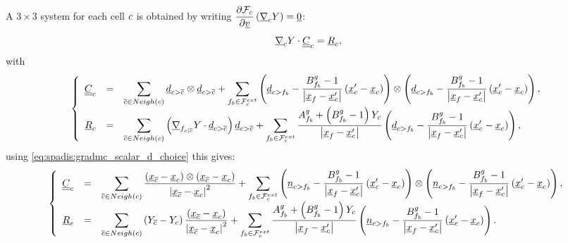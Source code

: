 A $3\times 3$ system for each cell $c$
is obtained by writing  $\dfrac{\partial \mathcal{F}_c}{\partial \underline{v} }
\left( \underline{\nabla}_{c} Y \right)= \underline{0}$:
%
\begin{equation}\label{eq:spadis:gradmc_matrix}
\underline{\nabla}_{c} Y \cdot \underline{\underline{C}}_{c} = \underline{R}_{c} ,
\end{equation}
with
%
\begin{equation}
\left\{
\begin{array}{r c l}
\underline{\underline{C}}_{c} &=&
\displaystyle
 \sum\limits_{{\overline{c}} \in Neigh\left(c\right) }
 \underline{d}_{{c > {\overline{c}}}} \otimes \underline{d}_{{c > {\overline{c}}}}
+
\sum\limits_{{{f}_{b}} \in \mathcal{F}^{ext}_{c}}
\left( \underline{d}_{c>{{f}_{b}}} -\dfrac{ B^g_{{f}_{b}} -1}{\left| \underline{x}_{{f}} - \underline{x}_{c}^\prime \right|}  \left(\underline{x}_{c}^\prime - {\underline{x}_{c}}\right) \right)
\otimes
\left( \underline{d}_{c>{{f}_{b}}} -\dfrac{ B^g_{{f}_{b}} -1}{\left| \underline{x}_{{f}} - \underline{x}_{c}^\prime \right|}  \left(\underline{x}_{c}^\prime - {\underline{x}_{c}}\right) \right),
\\
\underline{R}_{c} &=&
\displaystyle
\sum\limits_{ {\overline{c}} \in Neigh\left(c\right) }
\left( \underline{\nabla}_{{{f}_{c|{\overline{c}}}}} Y   \cdot \underline{d}_{{c > {\overline{c}}}} \right) \underline{d}_{{c > {\overline{c}}}}
+
\sum\limits_{ {{f}_{b}} \in \mathcal{F}^{ext}_{c}}
\dfrac{
A^g_{{{f}_{b}}} +\left(B^g_{{{f}_{b}}} -1 \right) Y_{c}
}{
\left| \underline{x}_{{f}} - \underline{x}_{c}^\prime \right|
}
\left( \underline{d}_{c>{{f}_{b}}} -  \dfrac{B^g_{{{f}_{b}}} -1 }{\left| \underline{x}_{{f}} - \underline{x}_{c}^\prime \right|} \left(\underline{x}_{c}^\prime - {\underline{x}_{c}}\right) \right),
\end{array}\right.
\end{equation}
%
using \eqref{eq:spadis:gradmc_scalar_d_choice} this gives:
\begin{equation}
\left\lbrace
\begin{array}{r c l}
\underline{\underline{C}}_{c} &=&
\displaystyle
 \sum\limits_{{\overline{c}} \in Neigh\left(c\right) }
 \dfrac{\left(\underline{x}_{{\overline{c}}} - {\underline{x}_{c}}\right) \otimes \left(\underline{x}_{{\overline{c}}} - {\underline{x}_{c}}\right)}{\left| \underline{x}_{{\overline{c}}} - {\underline{x}_{c}} \right|^2}
 +
\sum\limits_{{{f}_{b}} \in \mathcal{F}^{ext}_{c}}
\left( \underline{n}_{c>{{f}_{b}}} -\dfrac{ B^g_{{{f}_{b}}} -1}{\left| \underline{x}_{{f}} - \underline{x}_{c}^\prime \right|}  \left(\underline{x}_{c}^\prime - {\underline{x}_{c}}\right) \right)
\otimes
\left( \underline{n}_{c>{{f}_{b}}} -\dfrac{ B^g_{{{f}_{b}}} -1}{\left| \underline{x}_{{f}} - \underline{x}_{c}^\prime \right|}  \left(\underline{x}_{c}^\prime - {\underline{x}_{c}}\right) \right),
\\
\underline{R}_{c} &=&
\displaystyle
\sum\limits_{ {\overline{c}} \in Neigh\left(c\right) }
\left( Y_{{\overline{c}}} - Y_{c}  \right) \dfrac{ \left(\underline{x}_{{\overline{c}}} - {\underline{x}_{c}}\right)}{\left| \underline{x}_{{\overline{c}}} - {\underline{x}_{c}} \right|^2}
+
\sum\limits_{ {{f}_{b}} \in \mathcal{F}^{ext}_{c}}
\dfrac{
A^g_{{{f}_{b}}} +\left(B^g_{{{f}_{b}}} -1 \right) Y_{c}
}{
\left| \underline{x}_{{f}} - \underline{x}_{c}^\prime \right|
}
\left( \underline{n}_{c>{{f}_{b}}} -  \dfrac{B^g_{{{f}_{b}}} -1 }{\left| \underline{x}_{{f}} - \underline{x}_{c}^\prime \right|} \left(\underline{x}_{c}^\prime - {\underline{x}_{c}}\right) \right).
\end{array}\right.
\end{equation}

